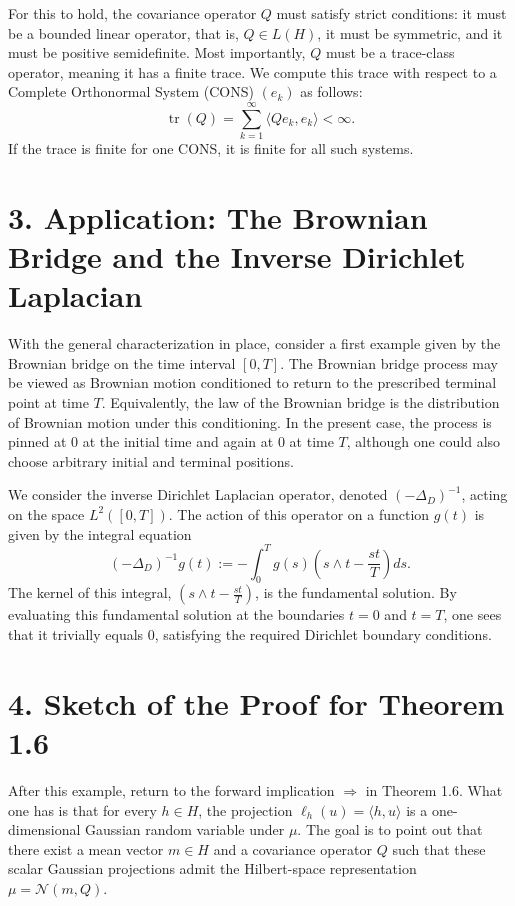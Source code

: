 \documentclass[11pt]{article}
\theoremstyle{definition}
\theoremstyle{remark}
\DeclareMathOperator{\tr}{tr}
\begin{document}
For this to hold, the covariance operator $Q$ must satisfy strict conditions: it must be a bounded linear operator, that is, $Q\in L(H)$, it must be symmetric, and it must be positive semidefinite. Most importantly, $Q$ must be a trace-class operator, meaning it has a finite trace. We compute this trace with respect to a Complete Orthonormal System (CONS) $(e_k)$ as follows:
\[
\tr(Q)=\sum_{k=1}^{\infty}\langle Qe_k,e_k\rangle<\infty.
\]
If the trace is finite for one CONS, it is finite for all such systems.

\section*{3. Application: The Brownian Bridge and the Inverse Dirichlet Laplacian}
With the general characterization in place, consider a first example given by the Brownian bridge on the time interval $[0,T]$.
The Brownian bridge process may be viewed as Brownian motion conditioned to return to the prescribed terminal point at time $T$. Equivalently, the law of the Brownian bridge is the distribution of Brownian motion under this conditioning. In the present case, the process is pinned at $0$ at the initial time and again at $0$ at time $T$, although one could also choose arbitrary initial and terminal positions.

We consider the inverse Dirichlet Laplacian operator, denoted $(-\Delta_D)^{-1}$, acting on the space $L^2([0,T])$. The action of this operator on a function $g(t)$ is given by the integral equation
\[
(-\Delta_D)^{-1}g(t):=-\int_0^T g(s)\left(s\wedge t-\frac{st}{T}\right)ds.
\]
The kernel of this integral, \(\left(s\wedge t-\frac{st}{T}\right)\), is the fundamental solution. By evaluating this fundamental solution at the boundaries $t=0$ and $t=T$, one sees that it trivially equals $0$, satisfying the required Dirichlet boundary conditions.

\section*{4. Sketch of the Proof for Theorem 1.6}
After this example, return to the forward implication \(\Rightarrow\) in Theorem 1.6.
What one has is that for every \(h\in H\), the projection \(\ell_h(u)=\langle h,u\rangle\) is a one-dimensional Gaussian random variable under \(\mu\). The goal is to point out that there exist a mean vector \(m\in H\) and a covariance operator \(Q\) such that these scalar Gaussian projections admit the Hilbert-space representation \(\mu=\mathcal N(m,Q)\).
\end{document}
